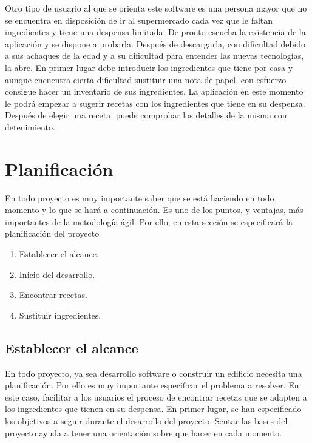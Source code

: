 Otro tipo de usuario al que se orienta este software es una persona mayor que no se encuentra en disposición de ir al supermercado cada vez que le faltan ingredientes y tiene una despensa limitada. De pronto escucha la existencia de la aplicación y se dispone a probarla. Después de descargarla, con dificultad debido a sus achaques de la edad y a su dificultad para entender las nuevas tecnologías, la abre. En primer lugar debe introducir los ingredientes que tiene por casa y aunque encuentra cierta dificultad sustituir una nota de papel, con esfuerzo consigue hacer un inventario de sus ingredientes. La aplicación en este momento le podrá empezar a sugerir recetas con los ingredientes que tiene en su despensa. Después de elegir una receta, puede comprobar los detalles de la misma con detenimiento.

\section{Planificación}
En todo proyecto es muy importante saber que se está haciendo en todo momento y lo que se hará a continuación. Es uno de los puntos, y ventajas, más importantes de la metodología ágil. Por ello, en esta sección se especificará la planificación del proyecto\:
\begin{enumerate}
    \item Establecer el alcance.
    \item Inicio del desarrollo.
    \item Encontrar recetas.
    \item Sustituir ingredientes.
\end{enumerate}

\subsection{Establecer el alcance}
En todo proyecto, ya sea desarrollo software o construir un edificio necesita una planificación. Por ello es muy importante especificar el problema a resolver. En este caso, facilitar a los usuarios el proceso de encontrar recetas que se adapten a los ingredientes que tienen en su despensa. En primer lugar, se han especificado los objetivos a seguir durante el desarrollo del proyecto. Sentar las bases del proyecto ayuda a tener una orientación sobre que hacer en cada momento. 

